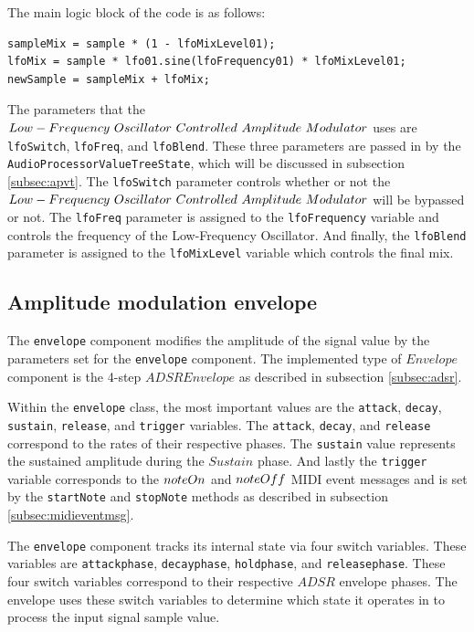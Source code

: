\documentclass[a4paper,12pt]{report}
\begin{document}
The main logic block of the code is as follows:

 \noindent\begin{minipage}{\linewidth} \begin{lstlisting}[caption={LFO Mix},label={code:mixlevels},captionpos=b]
sampleMix = sample * (1 - lfoMixLevel01);
lfoMix = sample * lfo01.sine(lfoFrequency01) * lfoMixLevel01;
newSample = sampleMix + lfoMix;
\end{lstlisting} \end{minipage}

The parameters that the $Low-Frequency\ \-Oscillator\ \-Controlled\ \-Amplitude\ \-Modulator$ uses are \texttt{lfo\-Switch}, \texttt{lfo\-Freq}, and \texttt{lfo\-Blend}. These three parameters are passed in by the \texttt{Audio\-Processor\-Value\-Tree\-State}, which will be discussed in subsection \ref{subsec:apvt}. The \texttt{lfo\-Switch} parameter controls whether or not the $Low-Frequency\ \-Oscillator\ \-Controlled\ \-Amplitude\ \-Modulator$ will be bypassed or not. The \texttt{lfo\-Freq} parameter is assigned to the \texttt{lfo\-Frequency} variable and controls the frequency of the Low-Frequency Oscillator. And finally, the \texttt{lfo\-Blend} parameter is assigned to the \texttt{lfo\-Mix\-Level} variable which controls the final mix.

\subsection{Amplitude modulation envelope}
\label{subsec:amenv}
The \texttt{envelope} component modifies the amplitude of the signal value by the parameters set for the \texttt{envelope} component. The implemented type of $Envelope$ component is the 4-step $ADSR Envelope$ as described in subsection \ref{subsec:adsr}. 

Within the \texttt{envelope} class, the most important values are the \texttt{attack}, \texttt{decay}, \texttt{sustain}, \texttt{release}, and \texttt{trigger} variables. The \texttt{attack}, \texttt{decay}, and \texttt{release} correspond to the rates of their respective phases. The \texttt{sustain} value represents the sustained amplitude during the $Sustain$ phase. And lastly the \texttt{trigger} variable corresponds to the $note\-On$ and $note\-Off$ MIDI event messages and is set by the \texttt{start\-Note} and \texttt{stop\-Note} methods as described in subsection \ref{subsec:midieventmsg}.

The \texttt{envelope} component tracks its internal state via four switch variables. These variables are \texttt{attack\-phase}, \texttt{decay\-phase}, \texttt{hold\-phase}, and \texttt{release\-phase}. These four switch variables correspond to their respective $ADSR$ envelope phases. The envelope uses these switch variables to determine which state it operates in to process the input signal sample value. 
\end{document}
